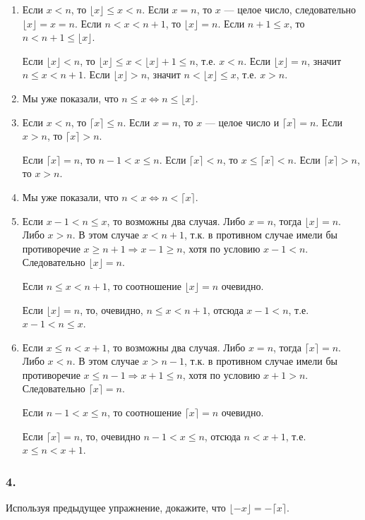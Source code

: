 \documentclass{book}
\begin{document}
\begin{enumerate}[label=\alph*)]
\item
  Если $x<n$, то $\lfloor x\rfloor\leq x<n$.
  Если $x=n$, то $x$ --- целое число, следовательно $\lfloor x\rfloor=x=n$.
  Если $n<x<n+1$, то $\lfloor x\rfloor=n$.
  Если $n+1\leq x$, то $n<n+1\leq\lfloor x\rfloor$.

  Если $\lfloor x\rfloor<n$, то $\lfloor x\rfloor\leq x<\lfloor x\rfloor+1\leq n$, т.е. $x<n$.
  Если $\lfloor x\rfloor=n$, значит $n\leq x<n+1$.
  Если $\lfloor x\rfloor>n$, значит $n<\lfloor x\rfloor\leq x$, т.е. $x>n$.
\item Мы уже показали, что $n\leq x\Longleftrightarrow n\leq\lfloor x\rfloor$.
\item
  Если $x<n$, то $\lceil x\rceil\leq n$.
  Если $x=n$, то $x$ --- целое число и $\lceil x\rceil=n$.
  Если $x>n$, то $\lceil x\rceil>n$.
  
  Если $\lceil x\rceil=n$, то $n-1<x\leq n$.
  Если $\lceil x\rceil<n$, то $x\leq\lceil x\rceil<n$.
  Если $\lceil x\rceil>n$, то $x>n$.
\item Мы уже показали, что $n<x\Longleftrightarrow n<\lceil x\rceil$.
\item
  Если $x-1<n\leq x$, то возможны два случая.
  Либо $x=n$, тогда $\lfloor x\rfloor=n$.
  Либо $x>n$. В этом случае $x<n+1$, т.к. в противном случае имели бы противоречие $x\geq n+1 \Rightarrow x-1\geq n$, хотя по условию $x-1<n$.
  Следовательно $\lfloor x\rfloor=n$.

  Если $n\leq x<n+1$, то соотношение $\lfloor x\rfloor=n$ очевидно.

  Если $\lfloor x\rfloor=n$, то, очевидно, $n\leq x<n+1$, отсюда $x-1<n$, т.е. $x-1<n\leq x$.
\item
  Если $x\leq n<x+1$, то возможны два случая.
  Либо $x=n$, тогда $\lceil x\rceil=n$.
  Либо $x<n$. В этом случае $x>n-1$, т.к. в противном случае имели бы противоречие $x\leq n-1\Rightarrow x+1\leq n$, хотя по условию $x+1>n$.
  Следовательно $\lceil x\rceil=n$.

  Если $n-1<x\leq n$, то соотношение $\lceil x\rceil=n$ очевидно.

  Если $\lceil x\rceil=n$, то, очевидно $n-1<x\leq n$, отсюда $n<x+1$, т.е. $x\leq n<x+1$.
\end{enumerate}

\subsubsection{4.}
Используя предыдущее упражнение, докажите, что $\lfloor -x\rfloor =-\lceil x\rceil$.
\end{document}
